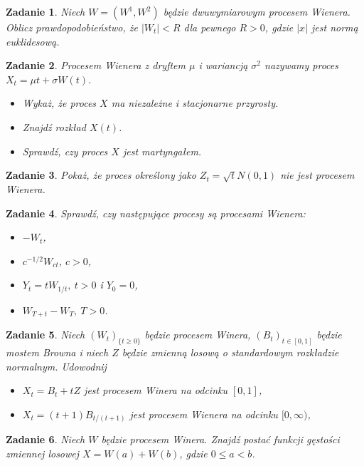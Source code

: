 \documentclass{mwart}
\newtheorem{zd}{Zadanie}
\begin{document}
\begin{zd}
Niech $W = (W^1, W^2)$ będzie dwuwymiarowym procesem Wienera. Oblicz prawdopodobieństwo, że $|W_t| < R$ dla pewnego $R > 0$, gdzie $|x|$ jest normą euklidesową.
\end{zd}

\begin{zd}
Procesem Wienera z dryftem $\mu$ i wariancją $\sigma^2$ nazywamy proces $X_t = \mu t+ \sigma W(t)$.
\begin{itemize}
\item Wykaż, że proces $X$ ma niezależne i stacjonarne przyrosty.
\item Znajdź rozkład $X(t)$.
\item Sprawdź, czy proces $X$ jest martyngałem.
\end{itemize}
\end{zd}

\begin{zd}
	Pokaż, że proces określony jako $Z_t = \sqrt{t}N(0,1)$ nie jest procesem Wienera.
\end{zd}

\begin{zd}
	Sprawdź, czy następujące procesy są procesami Wienera:
	\begin{itemize}
		\item $-W_t$,
		\item $c^{-1/2}W_{ct}$, $c>0$,
		\item $Y_t = tW_{1/t},\ t> 0$ i $Y_0 = 0$,
		\item $W_{T+t} - W_T, \ T > 0$.
	\end{itemize}
\end{zd}

\begin{zd}
Niech $(W_t)_{\{t \geq 0\}}$ będzie procesem Winera, $(B_t)_{t\in [0, 1]}$ będzie mostem Browna i niech $Z$ będzie zmienną losową o standardowym rozkładzie normalnym. Udowodnij
\begin{itemize}
\item $X_t = B_t+tZ$ jest procesem Winera na odcinku $[0, 1]$,
\item $X_t = (t+1)B_{t/(t+1)}$ jest procesem Wienera na odcinku $[0, \infty)$,
\end{itemize}
\end{zd}

\begin{zd}
Niech $W$ będzie procesem Winera. Znajdź postać funkcji gęstości zmiennej losowej $X = W(a) + W(b)$, gdzie $0 \leq a < b$.
\end{zd}
\end{document}
